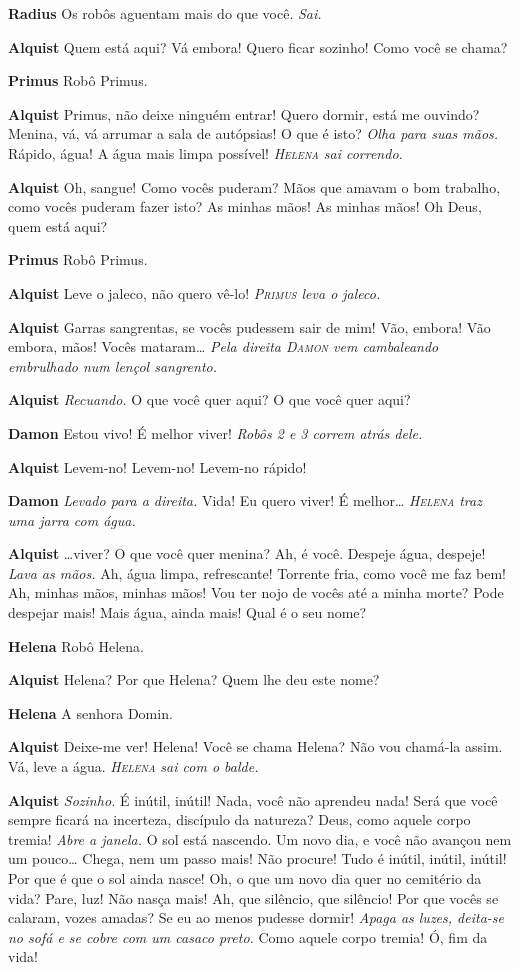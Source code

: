 \textbf{Radius} Os robôs aguentam mais do que você. \emph{Sai.}

\textbf{Alquist} Quem está aqui? Vá embora! Quero ficar sozinho! Como você se
chama?

\textbf{Primus} Robô Primus.

\textbf{Alquist} Primus, não deixe ninguém entrar! Quero dormir, está me ouvindo?
Menina, vá, vá arrumar a sala de autópsias! O que é isto? \emph{Olha para suas
mãos.} Rápido, água! A água mais limpa possível!
\emph{\textsc{Helena} sai correndo.}

\textbf{Alquist} Oh, sangue! Como vocês puderam? Mãos que amavam o bom trabalho,
como vocês puderam fazer isto? As minhas mãos! As minhas mãos! Oh Deus, quem
está aqui?

\textbf{Primus} Robô Primus.

\textbf{Alquist} Leve o jaleco, não quero vê-lo!
\emph{\textsc{Primus} leva o jaleco.}

\textbf{Alquist} Garras sangrentas, se vocês pudessem sair de mim! Vão, embora! Vão
embora, mãos! Vocês mataram\ldots{}
\emph{Pela direita \textsc{Damon} vem cambaleando embrulhado num lençol sangrento.}

\textbf{Alquist} \emph{Recuando.} O que você quer aqui? O que você quer aqui?

\textbf{Damon} Estou vivo! É melhor viver!
\emph{Robôs 2 e 3 correm atrás dele.}

\textbf{Alquist} Levem-no! Levem-no! Levem-no rápido!

\textbf{Damon} \emph{Levado para a direita.} Vida! Eu quero viver! É melhor\ldots{}
\emph{\textsc{Helena} traz uma jarra com água.}

\textbf{Alquist} \ldots{}viver? O que você quer menina? Ah, é você. Despeje água, despeje!
\emph{Lava as mãos.} Ah, água limpa, refrescante! Torrente fria, como você me faz bem!
Ah, minhas mãos, minhas mãos! Vou ter nojo de vocês até a minha morte? Pode
despejar mais! Mais água, ainda mais! Qual é o seu nome?

\textbf{Helena} Robô Helena.

\textbf{Alquist} Helena? Por que Helena? Quem lhe deu este nome?

\textbf{Helena} A senhora Domin.

\textbf{Alquist} Deixe-me ver! Helena! Você se chama Helena? Não vou chamá-la assim.
Vá, leve a água.
\emph{\textsc{Helena} sai com o balde.}

\textbf{Alquist} \emph{Sozinho.} É inútil, inútil! Nada, você não aprendeu nada! 
Será que você sempre ficará na incerteza, discípulo da natureza?
Deus, como aquele corpo tremia! \emph{Abre a janela.} O sol
está nascendo. Um novo dia, e você não avançou nem um pouco\ldots{} Chega, nem um
passo mais! Não procure! Tudo é inútil, inútil, inútil! Por que é que o sol
ainda nasce! Oh, o que um novo dia quer no cemitério da vida? Pare, luz! Não
nasça mais! Ah, que silêncio, que silêncio! Por que vocês se calaram, vozes
amadas? Se eu ao menos pudesse dormir! \emph{Apaga as luzes, deita-se no
sofá e se cobre com um casaco preto.} Como aquele corpo tremia! Ó, fim da vida!

